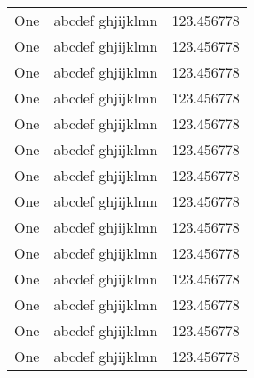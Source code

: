 \begin{ThreePartTable}
\begin{xltabular}{\textwidth}{XXX}
One & abcdef ghjijklmn & 123.456778 \\
One & abcdef ghjijklmn & 123.456778 \\
One & abcdef ghjijklmn & 123.456778 \\
One & abcdef ghjijklmn & 123.456778 \\
One & abcdef ghjijklmn & 123.456778 \\
One & abcdef ghjijklmn & 123.456778 \\
One & abcdef ghjijklmn & 123.456778 \\
One & abcdef ghjijklmn & 123.456778 \\
One & abcdef ghjijklmn & 123.456778 \\
One & abcdef ghjijklmn & 123.456778 \\
One & abcdef ghjijklmn & 123.456778 \\
One & abcdef ghjijklmn & 123.456778 \\
One & abcdef ghjijklmn & 123.456778 \\
One & abcdef ghjijklmn & 123.456778 \\
\bottomrule
\end{xltabular}
\end{ThreePartTable}
